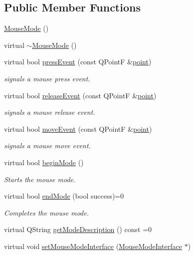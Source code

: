 \subsection*{Public Member Functions}
\begin{DoxyCompactItemize}
\item 
\mbox{\hyperlink{class_mouse_mode_aae493d25aba2bef7e671bda4b1a0634e}{Mouse\+Mode}} ()
\item 
virtual \mbox{\hyperlink{class_mouse_mode_a51be94cbe5d7f10debd220ca060eb1c5}{$\sim$\+Mouse\+Mode}} ()
\item 
virtual bool \mbox{\hyperlink{class_mouse_mode_ac726911a60e2cbd733d6d6a55d2ceba9}{press\+Event}} (const Q\+PointF \&\mbox{\hyperlink{diffusion_8cpp_a380468221cb8294f9329d11c99c4da30}{point}})
\begin{DoxyCompactList}\small\item\em signals a mouse press event. \end{DoxyCompactList}\item 
virtual bool \mbox{\hyperlink{class_mouse_mode_a9515661d7c29ab234b7e70d0fe7e5db0}{release\+Event}} (const Q\+PointF \&\mbox{\hyperlink{diffusion_8cpp_a380468221cb8294f9329d11c99c4da30}{point}})
\begin{DoxyCompactList}\small\item\em signals a mouse release event. \end{DoxyCompactList}\item 
virtual bool \mbox{\hyperlink{class_mouse_mode_adb2e2afbb2ac1793a665f1d227e12ce6}{move\+Event}} (const Q\+PointF \&\mbox{\hyperlink{diffusion_8cpp_a380468221cb8294f9329d11c99c4da30}{point}})
\begin{DoxyCompactList}\small\item\em signals a mouse move event. \end{DoxyCompactList}\item 
virtual bool \mbox{\hyperlink{class_mouse_mode_a32f232953a46467d2fe636df8907bd74}{begin\+Mode}} ()
\begin{DoxyCompactList}\small\item\em Starts the mouse mode. \end{DoxyCompactList}\item 
virtual bool \mbox{\hyperlink{class_mouse_mode_ad88ebf649b48364a343c86c14513039e}{end\+Mode}} (bool success)=0
\begin{DoxyCompactList}\small\item\em Completes the mouse mode. \end{DoxyCompactList}\item 
virtual Q\+String \mbox{\hyperlink{class_mouse_mode_aa442d3058243efe81e8052a137c2072e}{get\+Mode\+Description}} () const =0
\item 
virtual void \mbox{\hyperlink{class_mouse_mode_acb2cde6c1de5c6e3ac065bcf45604c98}{set\+Mouse\+Mode\+Interface}} (\mbox{\hyperlink{class_mouse_mode_interface}{Mouse\+Mode\+Interface}} $\ast$)
\end{DoxyCompactItemize}
